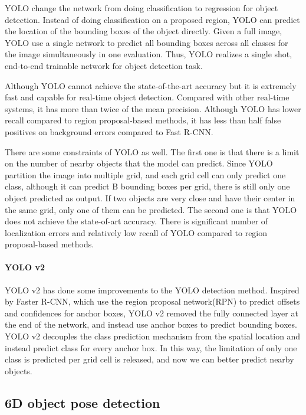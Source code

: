 YOLO change the network from doing classification to regression for object detection. Instead of doing classification on a proposed region, YOLO can predict the location of the bounding boxes of the object directly. Given a full image, YOLO use a single network to predict all bounding boxes across all classes for the image simultaneously in one evaluation. Thus, YOLO realizes a single shot, end-to-end trainable network for object detection task.

Although YOLO cannot achieve the state-of-the-art accuracy but it is extremely fast and capable for real-time object detection. Compared with other real-time systems, it has more than twice of the mean precision. Although YOLO has lower recall compared to region proposal-based methods, it has less than half false positives on background errors compared to Fast R-CNN.

There are some constraints of YOLO as well. The first one is that there is a limit on the number of nearby objects that the model can predict. Since YOLO partition the image into multiple grid, and each grid cell can only predict one class, although it can predict B bounding boxes per grid, there is still only one object predicted as output. If two objects are very close and have their center in the same grid, only one of them can be predicted. The second one is that YOLO does not achieve the state-of-art accuracy. There is significant number of localization errors and relatively low recall of YOLO compared to region proposal-based methods.

\paragraph{YOLO v2}
YOLO v2 has done some improvements to the YOLO detection method. Inspired by Faster R-CNN, which use the region proposal network(RPN) to predict offsets and confidences for anchor boxes, YOLO v2 removed the fully connected layer at the end of the network, and instead use anchor boxes to predict bounding boxes. YOLO v2 decouples the class prediction mechanism from the spatial location and instead predict class for every anchor box. In this way, the limitation of only one class is predicted per grid cell is released, and now we can better predict nearby objects.



\subsection{6D object pose detection}

